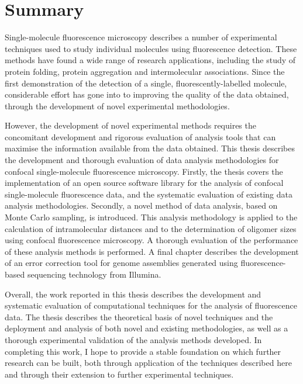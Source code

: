 \chapter*{Summary}
Single-molecule fluorescence microscopy describes a number of experimental techniques used to study individual molecules using fluorescence detection. These methods have found a wide range of research applications, including the study of protein folding, protein aggregation and intermolecular associations. Since the first demonstration of the detection of a single, fluorescently-labelled molecule, considerable effort has gone into to improving the quality of the data obtained, through the development of novel experimental methodologies.

However, the development of novel experimental methods requires the concomitant development and rigorous evaluation of analysis tools that can maximise the information available from the data obtained. This thesis describes the development and thorough evaluation of data analysis methodologies for confocal single-molecule fluorescence microscopy. Firstly, the thesis covers the implementation of an open source software library for the analysis of confocal single-molecule fluorescence data, and the systematic evaluation of existing data analysis methodologies. Secondly, a novel method of data analysis, based on Monte Carlo sampling, is introduced. This analysis methodology is applied to the calculation of intramolecular distances and to the determination of oligomer sizes using confocal fluorescence microscopy. A thorough evaluation of the performance of these analysis methods is performed. A final chapter describes the development of an error correction tool for genome assemblies generated using fluorescence-based sequencing technology from Illumina.

Overall, the work reported in this thesis describes the development and systematic evaluation of computational techniques for the analysis of fluorescence data. The thesis describes the theoretical basis of novel techniques and the deployment and analysis of both novel and existing methodologies, as well as a thorough experimental validation of the analysis methods developed. In completing this work, I hope to provide a stable foundation on which further research can be built, both through application of the techniques described here and through their extension to further experimental techniques.


